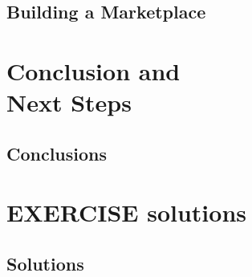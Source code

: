 \chapter{Building a Marketplace} \label{ch:Building a Marketplace}


\part{Conclusion and \\ Next Steps}
\newpage
\chapter{Conclusions} \label{ch:Conclusions}


\newpage
\part{EXERCISE solutions}
\chapter{Solutions}




\printglossary[title={Glossary}, type=main]



